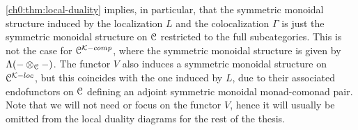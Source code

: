 \begin{remark}
    \label{ch0:rm:monoidal-structure-in-local-duality}
    \cref{ch0:thm:local-duality} implies, in particular, that the symmetric monoidal structure induced by the localization $L$ and the colocalization $\Gamma$ is just the symmetric monoidal structure on $\EuScript{C}$ restricted to the full subcategories. This is not the case for $\EuScript{C}^{\mathcal{K}-comp}$, where the symmetric monoidal structure is given by $\Lambda(-\otimes_{\EuScript{C}}-)$. The functor $V$ also induces a symmetric monoidal structure on $\EuScript{C}^{\mathcal{K}-loc}$, but this coincides with the one induced by $L$, due to their associated endofunctors on $\EuScript{C}$ defining an adjoint symmetric monoidal monad-comonad pair. Note that we will not need or focus on the functor $V$, hence it will usually be omitted from the local duality diagrams for the rest of the thesis. 
\end{remark}

